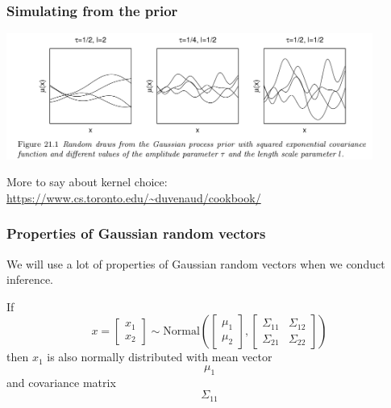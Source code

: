 \documentclass{beamer}
\begin{document}
\begin{frame}
\frametitle{Simulating from the prior}


\begin{center}
\includegraphics[width=120mm]{mu_realizations.png}
\end{center}

More to say about kernel choice: \url{https://www.cs.toronto.edu/~duvenaud/cookbook/}


\end{frame}
\begin{frame}
\frametitle{Properties of Gaussian random vectors}

We will use a lot of properties of Gaussian random vectors when we conduct inference.
\newline

If 
$$
x = 
\left[\begin{array}{c}
x_1 \\
x_2
\end{array}\right]
\sim
\text{Normal}\left( 
\left[\begin{array}{c}
\mu_1 \\
\mu_2
\end{array}\right],
\left[\begin{array}{cc}
\Sigma_{11} & \Sigma_{12} \\
\Sigma_{21} & \Sigma_{22} 
\end{array}\right]
\right)
$$
then $x_1$ is also normally distributed with mean vector
$$
\mu_1 
$$
and covariance matrix
$$
\Sigma_{11} 
$$


\end{frame}
\end{document}
